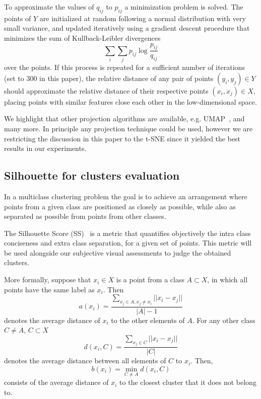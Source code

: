 \documentclass[sn-basic]{sn-jnl}%
\theoremstyle{thmstyleone}%
\theoremstyle{thmstyletwo}%
\theoremstyle{thmstylethree}%
\begin{document}
To approximate the values of $q_{ij}$ to $p_{ij}$ a minimization problem is solved. The points of $Y$ are initialized at random following a normal distribution with very small variance, and updated iteratively using a gradient descent procedure that minimizes the sum of Kullback-Leibler divergences
\begin{equation}
	\label{eq:c}
	\sum\limits_{i} \sum\limits_{j} p_{ij} \log \frac{p_{ij}}{q_{ij}}
\end{equation}
over the points. If this process is repeated for a sufficient number of iterations (set to 300 in this paper), the relative distance of any pair of points $(y_i, y_j) \in Y$ should approximate the relative distance of their respective points $(x_i, x_j) \in X$, placing points with similar features close each other in the low-dimensional space.

We highlight that other projection algorithms are available, e.g. UMAP~\citep{umap-paper}, and many more. In principle any projection technique could be used, however we are restricting the discussion in this paper to the t-SNE since it yielded the best results in our experiments.


\subsection{Silhouette for clusters evaluation}

In a multiclass clustering problem the goal is to achieve an arrangement where points from a given class are positioned as closely as possible, while also as separated as possible from points from other classes.

The Silhouette Score (SS)~\citep{rousseeuw-silhouette} is a metric that quantifies objectively the intra class conciseness and extra class separation, for a given set of points. This metric will be used alongside our subjective visual assessments to judge the obtained clusters.

More formally, suppose that $x_i \in X$ is a point from a class $A \subset X$, in which all points have the same label as $x_i$. Then
\begin{equation}
a(x_i) = \frac{ \sum\limits_{x_j \in A, x_j \neq x_i} || x_i - x_j || }{|A| - 1}
\end{equation}
denotes the average distance of $x_i$ to the other elements of $A$. 
For any other class $C \neq A$, $C \subset X$
\begin{equation}
d(x_i, C) = \frac{\sum\limits_{x_j \in C} || x_i - x_j || }{|C|}
\end{equation}
denotes the average distance between all elements of $C$ to $x_i$. Then,
\begin{equation}
b(x_i) = \min\limits_{C \neq A} d(x_i, C)
\end{equation}
consists of the average distance of $x_i$ to the closest cluster that it does not belong to.
\end{document}
